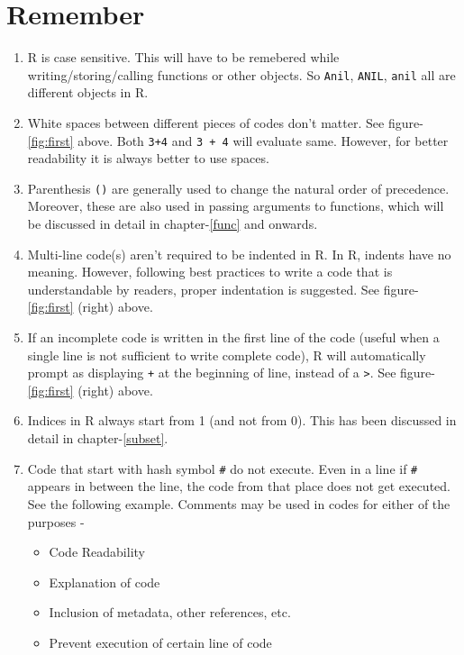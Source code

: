 \documentclass[
]{book}
\providecommand{\tightlist}{%
  \setlength{\itemsep}{0pt}\setlength{\parskip}{0pt}}
\begin{document}
\hypertarget{remember}{%
\section{Remember}\label{remember}}

\begin{enumerate}
\def\labelenumi{\arabic{enumi}.}
\tightlist
\item
  R is case sensitive. This will have to be remebered while writing/storing/calling functions or other objects. So \texttt{Anil}, \texttt{ANIL}, \texttt{anil} all are different objects in R.
\item
  White spaces between different pieces of codes don't matter. See figure-\ref{fig:first} above. Both \texttt{3+4} and \texttt{3\ +\ 4} will evaluate same. However, for better readability it is always better to use spaces.
\item
  Parenthesis \texttt{()} are generally used to change the natural order of precedence. Moreover, these are also used in passing arguments to functions, which will be discussed in detail in chapter-\ref{func} and onwards.
\item
  Multi-line code(s) aren't required to be indented in R. In R, indents have no meaning. However, following best practices to write a code that is understandable by readers, proper indentation is suggested. See figure-\ref{fig:first} (right) above.
\item
  If an incomplete code is written in the first line of the code (useful when a single line is not sufficient to write complete code), R will automatically prompt as displaying \texttt{+} at the beginning of line, instead of a \texttt{\textgreater{}}. See figure-\ref{fig:first} (right) above.
\item
  Indices in R always start from 1 (and not from 0). This has been discussed in detail in chapter-\ref{subset}.
\item
  Code that start with hash symbol \texttt{\#} do not execute. Even in a line if \texttt{\#} appears in between the line, the code from that place does not get executed. See the following example. Comments may be used in codes for either of the purposes -

  \begin{itemize}
  \tightlist
  \item
    Code Readability
  \item
    Explanation of code
  \item
    Inclusion of metadata, other references, etc.
  \item
    Prevent execution of certain line of code
  \end{itemize}
\end{enumerate}
\end{document}
